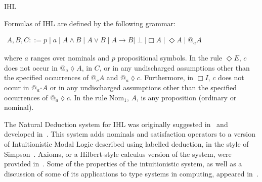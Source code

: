 \begin{entry}{IHL}
\begin{clarifications}
  Formulas of IHL are defined by the following grammar:
  \begin{center} 
    \begin{math}
      \begin{array}{lll}
        A,B,C ::= p \mid a \mid A \land B \mid A \lor B \mid A \rightarrow B \mid \perp \mid \Box A \mid \Diamond A \mid @_a A
      \end{array}
    \end{math}
  \end{center}
  where $a$ ranges over nominals and $p$ propositional symbols. In the
  rule $\Diamond E$, $c$ does not occur in $@_a \lozenge A $, in $C$,
  or in any undischarged assumptions other than the specified
  occurrences of $@_c A$ and $@_a \lozenge c $.  Furthermore, in $\Box
  I$, $c$ does not occur in $@_a \square A $ or in any undischarged
  assumptions other than the specified occurrences of $@_a \lozenge
  c$.  In the rule $\text{Nom}_1$, $A$, is any proposition (ordinary
  or nominal).
\end{clarifications}

\begin{history}
  The Natural Deduction system for IHL was originally suggested
  in~\cite{braunerdepaiva2003} and developed in~\cite{braunerdepaiva2006}.
  This system adds nominals and satisfaction operators to a version of
  Intuitionistic Modal Logic described using labelled deduction, in the
  style of Simpson~\cite{simpson1994}.  Axioms, or a Hilbert-style
  calculus version of the system, were provided in~\cite{brauner2006}.
  Some of the properties of the intuitionistic system, as well as a
  discussion of some of its applications to type systems in computing,
  appeared in~\cite{brauner2011}.
\end{history}


\end{entry}
